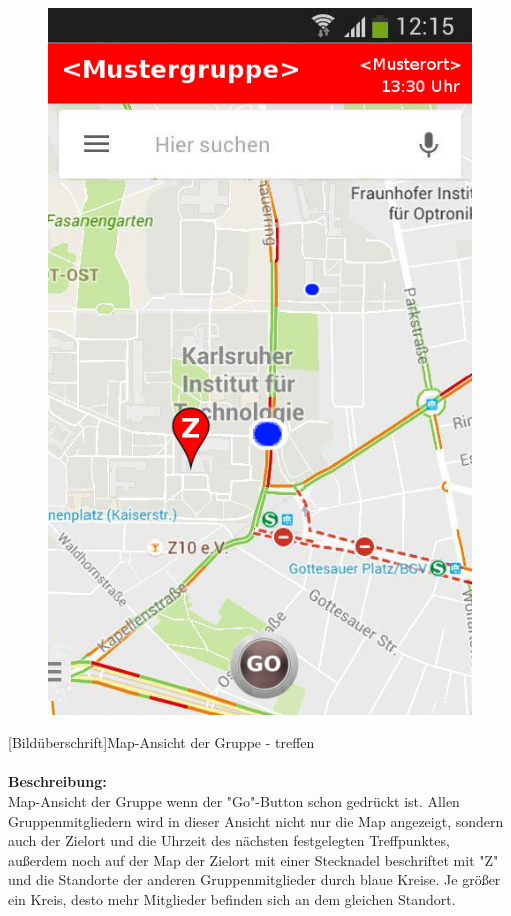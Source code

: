 \begin{figure}
	\includegraphics[scale =1]{resources/images/map_Go.png}
\end{figure}
[Bildüberschrift]Map-Ansicht der Gruppe - treffen\\ \\
\textbf{Beschreibung:}\\
Map-Ansicht der Gruppe wenn der "Go"-Button schon gedrückt ist. Allen Gruppenmitgliedern wird in dieser Ansicht nicht nur die Map angezeigt, sondern auch der Zielort und die Uhrzeit des nächsten festgelegten Treffpunktes, außerdem noch auf der Map der Zielort mit einer Stecknadel beschriftet mit "Z" und die Standorte der anderen Gruppenmitglieder durch blaue Kreise. Je größer ein Kreis, desto mehr Mitglieder befinden sich an dem gleichen Standort.\\
